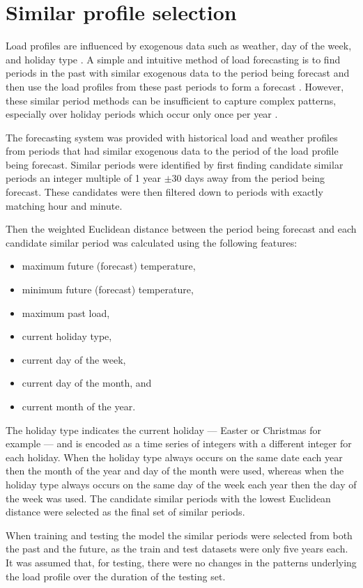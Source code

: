 \section{Similar profile selection} \label{simperiod}
Load profiles are influenced by exogenous data such as weather, day of the week, and holiday type \cite{Weron2006}.
A simple and intuitive method of load forecasting is to find periods in the past with similar exogenous data to the period being forecast and then use the load profiles from these past periods to form a forecast \cite{Senjyu1998}.
However, these similar period methods can be insufficient to capture complex patterns, especially over holiday periods which occur only once per year \cite{Chen2010}.


The forecasting system was provided with historical load and weather profiles from periods that had similar exogenous data to the period of the load profile being forecast.
Similar periods were identified by first finding candidate similar periods an integer multiple of 1 year $\pm$30 days away from the period being forecast.
These candidates were then filtered down to periods with exactly matching hour and minute.

Then the weighted Euclidean distance between the period being forecast and each candidate similar period was calculated using the following features: 
\begin{itemize}
	\item maximum future (forecast) temperature, 
	\item minimum future (forecast) temperature,
	\item maximum past load,
	\item current holiday type, 
	\item current day of the week,
	\item current day of the month, and
	\item current month of the year.
\end{itemize}

The holiday type indicates the current holiday --- Easter or Christmas for example --- and is encoded as a time series of integers with a different integer for each holiday.
When the holiday type always occurs on the same date each year then the month of the year and day of the month were used, whereas when the holiday type always occurs on the same day of the week each year then the day of the week was used.
The candidate similar periods with the lowest Euclidean distance were selected as the final set of similar periods.

When training and testing the model the similar periods were selected from both the past and the future, as the train and test datasets were only five years each.
It was assumed that, for testing, there were no changes in the patterns underlying the load profile over the duration of the testing set.